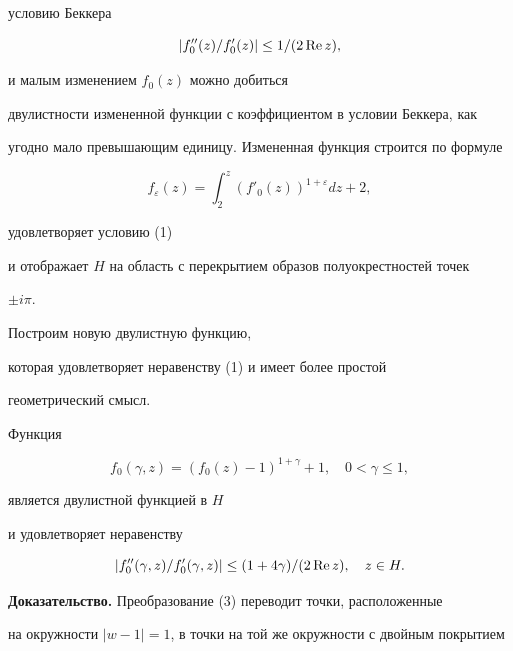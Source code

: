 условию Беккера 


$$ 


|f''_{0}(z)/f'_{0}(z)| \le 1/(2\re z), 


$$ 


и малым изменением $f_{0}(z)$ можно добиться 


двулистности измененной функции с коэффициентом в условии Беккера, как 


угодно мало превышающим единицу. Измененная функция строится по формуле 


$$ 


f_\varepsilon(z)=\int^z_2 (f'_0(z))^{1+\varepsilon}dz+2, 


$$ 


удовлетворяет условию (1) 


и отображает $H$ на область с перекрытием образов полуокрестностей точек 


$\pm i\pi$. 


 


Построим новую двулистную функцию, 


которая удовлетворяет неравенству (1) и имеет более простой 


геометрический смысл. 


 


\begin{thm} Функция 


\begin{equation} 


f_0(\gamma,z)=(f_0(z)-1)^{1+\gamma}+1,\quad 0<\gamma\le 1, 


\end{equation} 


является двулистной функцией в $H$ 


и удовлетворяет неравенству 


\begin{equation} 


|f''_0(\gamma,z)/f'_0(\gamma,z)|\le (1+4\gamma)/(2\re z), 


\quad z\in H. 


\end{equation} 


\end{thm}


 


{\bf Доказательство.} Преобразование (3) переводит точки, расположенные 


на окружности $|w-1|=1$, в точки на той же окружности с двойным покрытием 



